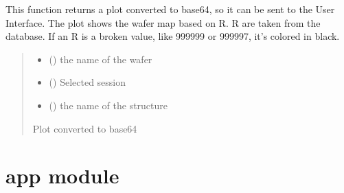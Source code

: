 \documentclass[letterpaper,10pt,english]{sphinxmanual}
\begin{document}
\begin{fulllineitems}
\label{\detokenize{WaferMaps:WaferMaps.R_wafer_map}}
\pysigstartsignatures
{}
\pysigstopsignatures
\sphinxAtStartPar
This function returns a plot converted to base64, so it can be sent to the User Interface. The plot shows the wafer map based on R.
R are taken from the database. If an R is a broken value, like 999999 or 999997, it’s colored in black.
\begin{quote}\begin{description}
\begin{itemize}
\item {} 
\sphinxAtStartPar
{} () \textendash{} the name of the wafer

\item {} 
\sphinxAtStartPar
{} () \textendash{} Selected session

\item {} 
\sphinxAtStartPar
{} () \textendash{} the name of the structure

\end{itemize}

\sphinxAtStartPar
Plot converted to base64

\end{description}\end{quote}

\end{fulllineitems}


\sphinxstepscope


\chapter{app module}
\label{\detokenize{app:module-app}}\label{\detokenize{app:app-module}}\label{\detokenize{app::doc}}
\end{document}
